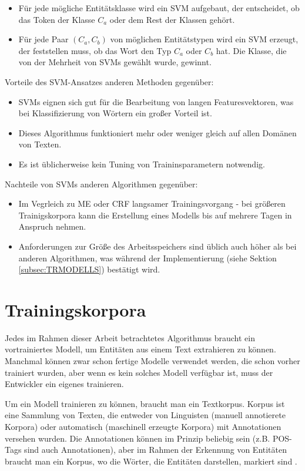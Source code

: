 \begin{itemize}
\item Für jede mögliche Entitätsklasse wird ein SVM aufgebaut, der entscheidet, ob das Token der Klasse $C_a$ oder dem Rest der Klassen gehört.
\item Für jede Paar $(C_a, C_b)$ von möglichen Entitätstypen wird ein SVM erzeugt, der feststellen muss, ob das Wort den Typ $C_a$ oder $C_b$ hat. Die Klasse, die von der Mehrheit von SVMs gewählt wurde, gewinnt.
\end{itemize}

Vorteile des SVM-Ansatzes anderen Methoden gegenüber\cite{joachims1998text}:
\begin{itemize}
\item SVMs eignen sich gut für die Bearbeitung von langen Featuresvektoren, was bei Klassifizierung von Wörtern ein großer Vorteil ist.
\item Dieses Algorithmus funktioniert mehr oder weniger gleich auf allen Domänen von Texten.
\item Es ist üblicherweise kein Tuning von Traininsparametern notwendig.
\end{itemize}

Nachteile von SVMs anderen Algorithmen gegenüber:
\begin{itemize}
\item Im Vegrleich zu ME oder CRF langsamer Trainingsvorgang - bei größeren Trainigskorpora kann die Erstellung eines Modells bis auf mehrere Tagen in Anspruch nehmen.
\item Anforderungen zur Größe des Arbeitsspeichers sind üblich auch höher als bei anderen Algorithmen, was während der Implementierung (siehe Sektion \ref{subsec:TRMODELLS}) bestätigt wird.
\end{itemize}

\section{Trainingskorpora} \label{sec:trcorpora}
Jedes im Rahmen dieser Arbeit betrachtetes Algorithmus braucht ein vortrainiertes Modell, um Entitäten aus einem Text extrahieren zu können. Manchmal können zwar schon fertige Modelle verwendet werden, die schon vorher trainiert wurden, aber wenn es kein solches Modell verfügbar ist, muss der Entwickler ein eigenes trainieren.

Um ein Modell trainieren zu können, braucht man ein Textkorpus. Korpus ist eine Sammlung von Texten, die entweder von Linguisten (manuell annotierete Korpora) oder automatisch (maschinell erzeugte Korpora) mit Annotationen versehen wurden. Die Annotationen können im Prinzip beliebig sein (z.B. POS-Tags sind auch Annotationen), aber im Rahmen der Erkennung von Entitäten braucht man ein Korpus, wo die Wörter, die Entitäten darstellen, markiert sind \cite{naf2006korpuslinguistik}.

